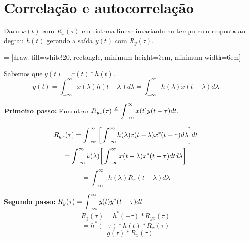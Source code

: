 \documentclass[12pt]{book}
\begin{document}
\section{Correlação e autocorrelação}


Dado $x(t)$ com $R_x(\tau)$ e o sistema linear invariante no tempo com resposta ao degrau $h(t)$ gerando a saída $y(t)$ com $R_y(\tau)$.

 = [draw, fill=white!20, rectangle, 
    minimum height=3em, minimum width=6em]
\begin{center}
\end{center}

Sabemos que $y(t) = x(t)*h(t)$.
\begin{equation}
y(t) = \int_{-\infty}^{\infty} x(\lambda) h(t-\lambda) d\lambda = \int_{-\infty}^{\infty} h(\lambda) x(t-\lambda) d\lambda
\end{equation}

\textbf{Primeiro passo:} Encontrar $R_{yx}(\tau) \triangleq \mathlarger{\int_{-\infty}^{\infty} x(t) y(t-\tau) dt}$.

\begin{equation}
R_{yx}(\tau) = \int_{-\infty}^{\infty} \bigg{[}
\int_{-\infty}^{\infty} h(\lambda)x(t-\lambda)x^*(t-\tau)d\lambda
\bigg{]}dt
\end{equation}
\begin{equation}
 = \int_{-\infty}^{\infty} h(\lambda) \bigg{[}
\int_{-\infty}^{\infty} x(t-\lambda)x^*(t-\tau)dtd\lambda
\bigg{]}
\end{equation}
\begin{equation}
 = \int_{-\infty}^{\infty} h(\lambda)
R_x(t-\lambda)d\lambda
\end{equation}

\textbf{Segundo passo:} $R_y(\tau) = \mathlarger{\int_{-\infty}^{\infty} y(t) y^*(t-\tau) dt}$
\begin{equation}
R_y(\tau) = h^*(-\tau)*R_{yx}(\tau)
\end{equation}
\begin{equation}
 = h^*(-\tau)*h(t)*R_x(\tau)
\end{equation}
\begin{equation}
 = g(\tau)*R_x(\tau)
\end{equation}
\end{document}

